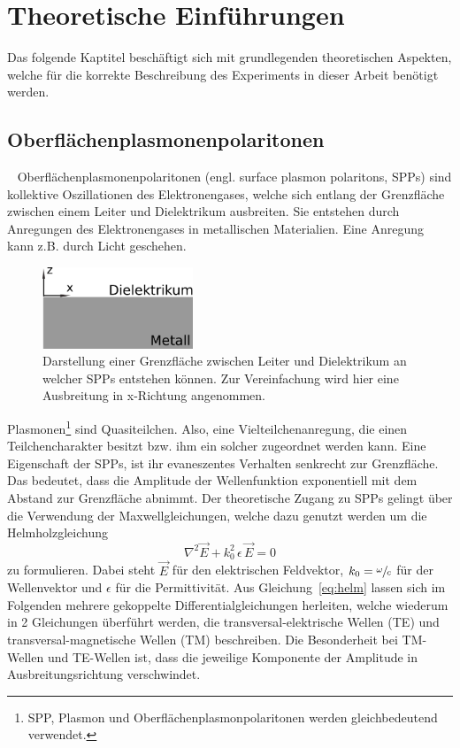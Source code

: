 \chapter{Theoretische Einführungen}
Das folgende Kaptitel beschäftigt sich mit grundlegenden theoretischen 
Aspekten, welche für die korrekte Beschreibung des Experiments in dieser
Arbeit benötigt werden.
\section{Oberflächenplasmonenpolaritonen}~\label{sec:spps}
Oberflächenplasmonenpolaritonen (engl. surface plasmon polaritons, SPPs)
sind kollektive Oszillationen des Elektronengases, welche sich entlang der Grenzfläche
zwischen einem Leiter und Dielektrikum ausbreiten.\cite{plasmonics}
Sie entstehen durch Anregungen des Elektronengases in metallischen Materialien.
Eine Anregung kann z.B. durch Licht geschehen.

\begin{figure}
    \includegraphics[width=4.5cm]{./Plots/leiter_und_nichtleiter.pdf}
    \caption{Darstellung einer Grenzfläche zwischen Leiter und Dielektrikum an welcher 
    SPPs entstehen können. Zur Vereinfachung wird hier eine Ausbreitung in x-Richtung angenommen.\\}
    \label{fig:kasten}
\end{figure}
\FloatBarrier

Plasmonen\footnote{SPP, Plasmon und Oberflächenplasmonpolaritonen werden gleichbedeutend verwendet.} sind Quasiteilchen. 
Also, eine Vielteilchenanregung, die einen Teilchencharakter besitzt bzw. ihm ein solcher zugeordnet werden kann. 
Eine Eigenschaft der SPPs, 
ist ihr evaneszentes Verhalten senkrecht zur Grenzfläche. Das bedeutet, 
dass die Amplitude der Wellenfunktion
exponentiell mit dem Abstand zur Grenzfläche abnimmt.
Der theoretische Zugang zu SPPs gelingt über die Verwendung der Maxwellgleichungen, welche dazu
genutzt werden um die Helmholzgleichung 
\begin{equation}
    \nabla^2 \vec{E} + k^2_0 \, \epsilon \, \vec{E} = 0
    \label{eq:helm}
\end{equation}
zu formulieren.\cite{plasmonics} 
Dabei steht $\vec{E}$ für den elektrischen Feldvektor, $k_0 = \sfrac{\omega}{c}$ 
für der Wellenvektor und $\epsilon$ für die Permittivität.
Aus Gleichung~\ref{eq:helm} lassen sich im Folgenden mehrere gekoppelte Differentialgleichungen
herleiten, welche wiederum in 2 Gleichungen überführt werden, die transversal-elektrische Wellen (TE) und 
transversal-magnetische Wellen (TM) beschreiben.
Die Besonderheit bei TM-Wellen und TE-Wellen ist, dass 
die jeweilige Komponente der Amplitude in Ausbreitungsrichtung verschwindet.

